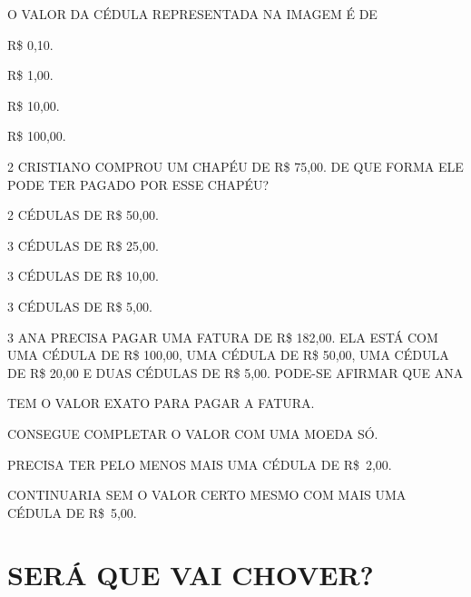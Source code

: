 O VALOR DA CÉDULA REPRESENTADA NA IMAGEM É DE

\begin{multicols}{2}
\begin{escolha}
\item R\$ 0,10.

\item R\$ 1,00.

\item R\$ 10,00.

\item R\$ 100,00.
\end{escolha}
\end{multicols}

\num{2} CRISTIANO COMPROU UM CHAPÉU DE R\$ 75,00. DE QUE FORMA ELE PODE TER PAGADO POR ESSE CHAPÉU?

\begin{multicols}{2}
\begin{escolha}
\item 2 CÉDULAS DE R\$ 50,00.

\item 3 CÉDULAS DE R\$ 25,00.

\item 3 CÉDULAS DE R\$ 10,00.

\item 3 CÉDULAS DE R\$ 5,00.
\end{escolha}
\end{multicols}


\num{3} ANA PRECISA PAGAR UMA FATURA DE R\$ 182,00. ELA ESTÁ COM UMA CÉDULA DE R\$ 100,00, UMA CÉDULA DE R\$ 50,00, UMA CÉDULA DE R\$ 20,00 E DUAS CÉDULAS DE R\$ 5,00. PODE-SE AFIRMAR QUE ANA

\begin{escolha}
\item TEM O VALOR EXATO PARA PAGAR A FATURA.

\item CONSEGUE COMPLETAR O VALOR COM UMA MOEDA SÓ.

\item PRECISA TER PELO MENOS MAIS UMA CÉDULA DE R\$~2,00.

\item CONTINUARIA SEM O VALOR CERTO MESMO COM MAIS UMA CÉDULA DE R\$~5,00.
\end{escolha}



\chapter{SERÁ QUE VAI CHOVER?}

